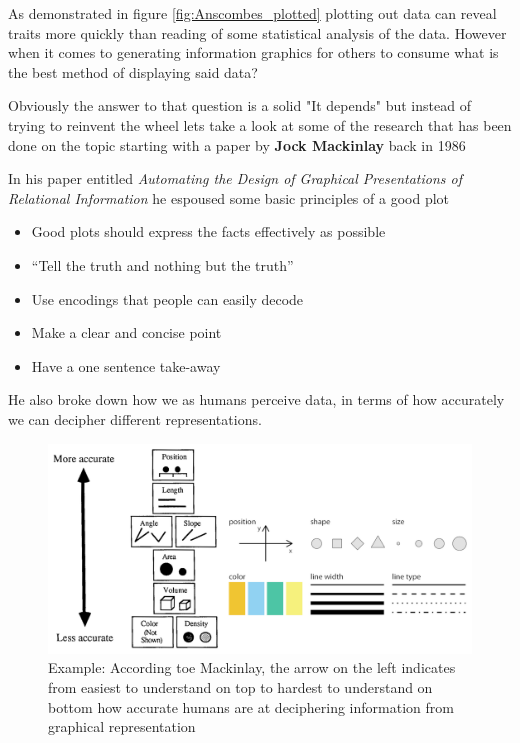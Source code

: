 \begin{flushleft}
As demonstrated in figure \ref{fig:Anscombes_plotted} plotting out data can reveal traits more quickly than reading of some statistical analysis of the data. However when it comes to generating information graphics for others to consume what is the best method of displaying said data?
\end{flushleft}
\begin{flushleft}
Obviously the answer to that question is a solid "It depends" but instead of trying to reinvent the wheel lets take a look at some of the research that has been done on the topic starting with a paper by \textbf{Jock Mackinlay} back in 1986
\end{flushleft}
\begin{flushleft}
In his paper entitled \textit{Automating the Design of Graphical Presentations of Relational Information} he espoused some basic principles of a good plot
    \begin{itemize}
        \item Good plots should express the facts eﬀectively as possible
        \item “Tell the truth and nothing but the truth”
        \item Use encodings that people can easily decode
        \item Make a clear and concise point
        \item Have a one sentence take-away
    \end{itemize}
\end{flushleft}
\begin{flushleft}
He also broke down how we as humans perceive data, in terms of how accurately we can decipher different representations.
\end{flushleft}
\begin{figure}[h]
    \centering
    \includegraphics[width=.55\textwidth]{figures/data_representation.png}
    \caption{Example: According toe Mackinlay, the arrow on the left indicates from easiest to understand on top to hardest to understand on bottom how accurate humans are at deciphering information from graphical representation}
    \label{fig:data_representation}
\end{figure}

